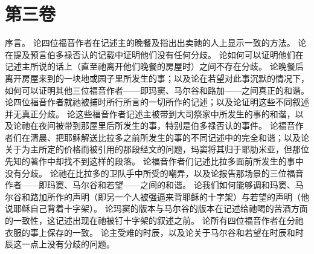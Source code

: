 
\section{第三卷}

\par

 序言。\newline{} 论四位福音作者在记述主的晚餐及指出出卖祂的人上显示一致的方法。\newline{} 论在提及预言伯多禄否认的记载中证明他们没有任何分歧。\newline{} 论如何可以证明他们在记述主所说的话上（直至祂离开他们晚餐的房屋时）之间不存在分歧。\newline{} 论晚餐后离开房屋来到的一块地或园子里所发生的事；以及论在若望对此事沉默的情况下，如何可以证明其他三位福音作者——即玛窦、马尔谷和路加——之间真正的和谐。\newline{} 论四位福音作者就祂被捕时所行所言的一切所作的记述；以及论证明这些不同叙述并无真正分歧。\newline{} 论这些福音作者记述主被带到大司祭家中所发生的事的和谐，以及论祂在夜间被带到那屋里后所发生的事，特别是伯多禄否认的事件。\newline{} 论福音作者们在清晨、把耶稣解送比拉多之前所发生的事的不同记述中的完全和谐；以及论关于为主所定的价格而被引用的那段经文的问题，玛窦将其归于耶肋米亚，但那位先知的著作中却找不到这样的段落。\newline{} 论福音作者们记述比拉多面前所发生的事中没有分歧。\newline{} 论祂在比拉多的卫队手中所受的嘲弄，以及论报告那场景的三位福音作者——即玛窦、马尔谷和若望——之间的和谐。\newline{} 论我们如何能够调和玛窦、马尔谷和路加所作的声明（即另一个人被强逼来背耶稣的十字架）与若望的声明（他说耶稣自己背着十字架）。\newline{} 论玛窦的版本与马尔谷的版本在记述给祂喝的苦酒方面的一致性，这记述出现在祂被钉十字架的叙述之前。\newline{} 论所有四位福音作者在分祂衣服的事上保存的一致。\newline{} 论主受难的时辰，以及论关于马尔谷和若望在时辰和时辰这一点上没有分歧的问题。\newline{} 